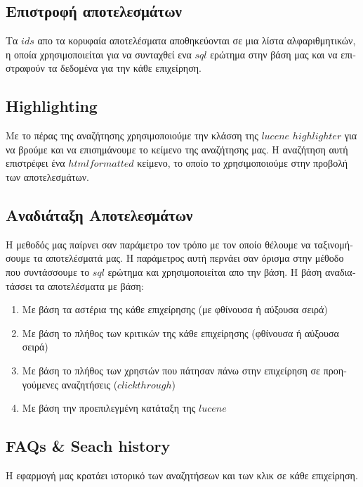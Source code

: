 \subsection{\textgreek{Επιστροφή αποτελεσμάτων}}
\textgreek{
Τα $ids$ απο τα κορυφαία αποτελέσματα αποθηκεύονται σε μια λίστα αλφαριθμητικών, η οποία χρησιμοποιείται για να συνταχθεί
ενα $sql$ ερώτημα στην βάση μας και να επιστραφούν τα δεδομένα για την κάθε επιχείρηση.
}

\subsection{Highlighting}
\textgreek{
Με το πέρας της αναζήτησης χρησιμοποιούμε την κλάσση της $lucene$ $highlighter$ για να βρούμε και να
επισημάνουμε το κείμενο της αναζήτησης μας.
Η αναζήτηση αυτή επιστρέφει ένα $html formatted$ κείμενο, το οποίο το χρησιμοποιούμε στην προβολή των αποτελεσμάτων.
}

\subsection{\textgreek{Αναδιάταξη Αποτελεσμάτων}}
\textgreek{
Η μεθοδός μας παίρνει σαν παράμετρο τον τρόπο με τον οποίο θέλουμε να ταξινομήσουμε τα αποτελέσματά μας.
Η παράμετρος αυτή περνάει σαν όρισμα στην μέθοδο που συντάσσουμε το $sql$ ερώτημα και χρησιμοποιείται απο την βάση.
Η βάση αναδιατάσσει τα αποτελέσματα με βάση:
}
\begin{enumerate}
    \item\textgreek{ Με βάση τα αστέρια της κάθε επιχείρησης (με φθίνουσα ή αύξουσα σειρά)}
    \item\textgreek{ Με βάση το πλήθος των κριτικών της κάθε επιχείρησης (φθίνουσα ή αύξουσα σειρά)}
    \item\textgreek{ Με βάση το πλήθος των χρηστών που πάτησαν πάνω στην επιχείρηση σε προηγούμενες αναζητήσεις ($clickthrough$)}
    \item\textgreek{ Με βάση την προεπιλεγμένη κατάταξη της $lucene$ }
\end{enumerate}

\subsection{FAQs \& Seach history}
\textgreek{
Η εφαρμογή μας κρατάει ιστορικό των αναζητήσεων και των κλικ σε κάθε επιχείρηση.
}
